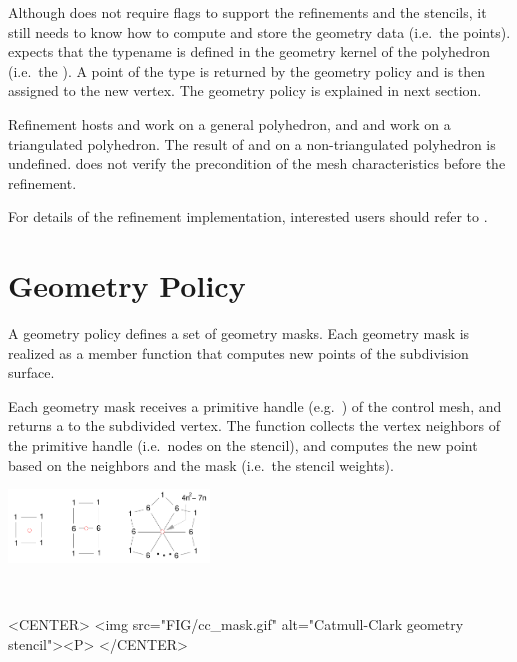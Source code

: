 Although  does not require flags
to support the refinements and the stencils, it
still needs to know how to compute and store the geometry
data (i.e.~the points).  
expects that the typename  is 
defined in the geometry kernel of the polyhedron
(i.e.~the ). 
A point of the type  is returned by the geometry 
policy and is then assigned to the new vertex.  
The geometry policy is explained in next section. 

Refinement hosts  and  work on a general 
polyhedron, and  and  work on a triangulated
polyhedron. The result of  and  on a non-triangulated
polyhedron is undefined.  does not verify
the precondition of the mesh characteristics before the refinement.

For details of the refinement implementation, 
interested users should refer to \cite{cgal:sp-mrbee-05}.

\section{Geometry Policy}
A geometry policy defines a set of geometry masks. 
Each geometry mask is realized as a member function
that computes new points of the subdivision surface. 

Each geometry mask receives a primitive handle 
(e.g.~) of the control mesh, 
and returns a  to the subdivided vertex. 
The function collects the vertex neighbors of the primitive handle 
(i.e.~nodes on the stencil), and computes the new point 
based on the neighbors and the mask (i.e.~the stencil weights).

\begin{ccTexOnly}
  \begin{center}
    \parbox{0.4\textwidth}{%
      \includegraphics[width=0.4\textwidth]{Subdivision_method_3/FIG/cc_mask}%
    } \\ \vspace{0.5cm}
  \end{center}
\end{ccTexOnly}
\begin{ccHtmlOnly}
  <CENTER>
     <img src="FIG/cc_mask.gif" alt="Catmull-Clark geometry stencil"><P>
  </CENTER>
\end{ccHtmlOnly}

